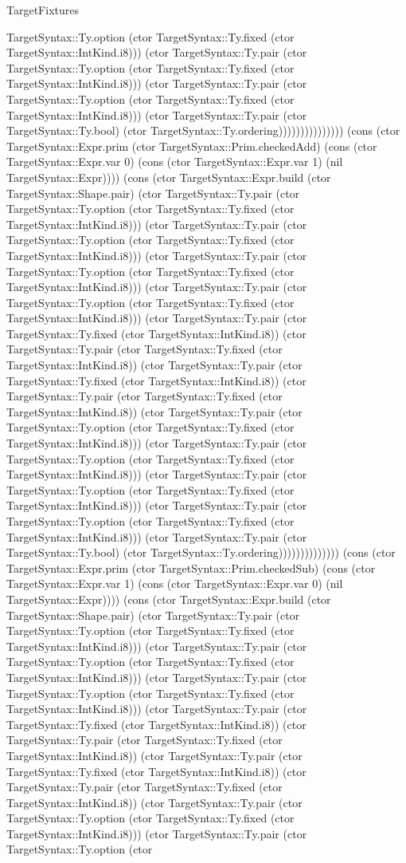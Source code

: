 \begin{lexlean}{TargetFixtures}
\begin{semanticmodule}
{TargetSyntax::Ty.option (ctor TargetSyntax::Ty.fixed (ctor TargetSyntax::IntKind.i8))) (ctor TargetSyntax::Ty.pair (ctor TargetSyntax::Ty.option (ctor TargetSyntax::Ty.fixed (ctor TargetSyntax::IntKind.i8))) (ctor TargetSyntax::Ty.pair (ctor TargetSyntax::Ty.option (ctor TargetSyntax::Ty.fixed (ctor TargetSyntax::IntKind.i8))) (ctor TargetSyntax::Ty.pair (ctor TargetSyntax::Ty.bool) (ctor TargetSyntax::Ty.ordering))))))))))))))) (cons (ctor TargetSyntax::Expr.prim (ctor TargetSyntax::Prim.checkedAdd) (cons (ctor TargetSyntax::Expr.var 0) (cons (ctor TargetSyntax::Expr.var 1) (nil TargetSyntax::Expr)))) (cons (ctor TargetSyntax::Expr.build (ctor TargetSyntax::Shape.pair) (ctor TargetSyntax::Ty.pair (ctor TargetSyntax::Ty.option (ctor TargetSyntax::Ty.fixed (ctor TargetSyntax::IntKind.i8))) (ctor TargetSyntax::Ty.pair (ctor TargetSyntax::Ty.option (ctor TargetSyntax::Ty.fixed (ctor TargetSyntax::IntKind.i8))) (ctor TargetSyntax::Ty.pair (ctor TargetSyntax::Ty.option (ctor TargetSyntax::Ty.fixed (ctor TargetSyntax::IntKind.i8))) (ctor TargetSyntax::Ty.pair (ctor TargetSyntax::Ty.option (ctor TargetSyntax::Ty.fixed (ctor TargetSyntax::IntKind.i8))) (ctor TargetSyntax::Ty.pair (ctor TargetSyntax::Ty.fixed (ctor TargetSyntax::IntKind.i8)) (ctor TargetSyntax::Ty.pair (ctor TargetSyntax::Ty.fixed (ctor TargetSyntax::IntKind.i8)) (ctor TargetSyntax::Ty.pair (ctor TargetSyntax::Ty.fixed (ctor TargetSyntax::IntKind.i8)) (ctor TargetSyntax::Ty.pair (ctor TargetSyntax::Ty.fixed (ctor TargetSyntax::IntKind.i8)) (ctor TargetSyntax::Ty.pair (ctor TargetSyntax::Ty.option (ctor TargetSyntax::Ty.fixed (ctor TargetSyntax::IntKind.i8))) (ctor TargetSyntax::Ty.pair (ctor TargetSyntax::Ty.option (ctor TargetSyntax::Ty.fixed (ctor TargetSyntax::IntKind.i8))) (ctor TargetSyntax::Ty.pair (ctor TargetSyntax::Ty.option (ctor TargetSyntax::Ty.fixed (ctor TargetSyntax::IntKind.i8))) (ctor TargetSyntax::Ty.pair (ctor TargetSyntax::Ty.option (ctor TargetSyntax::Ty.fixed (ctor TargetSyntax::IntKind.i8))) (ctor TargetSyntax::Ty.pair (ctor TargetSyntax::Ty.bool) (ctor TargetSyntax::Ty.ordering)))))))))))))) (cons (ctor TargetSyntax::Expr.prim (ctor TargetSyntax::Prim.checkedSub) (cons (ctor TargetSyntax::Expr.var 1) (cons (ctor TargetSyntax::Expr.var 0) (nil TargetSyntax::Expr)))) (cons (ctor TargetSyntax::Expr.build (ctor TargetSyntax::Shape.pair) (ctor TargetSyntax::Ty.pair (ctor TargetSyntax::Ty.option (ctor TargetSyntax::Ty.fixed (ctor TargetSyntax::IntKind.i8))) (ctor TargetSyntax::Ty.pair (ctor TargetSyntax::Ty.option (ctor TargetSyntax::Ty.fixed (ctor TargetSyntax::IntKind.i8))) (ctor TargetSyntax::Ty.pair (ctor TargetSyntax::Ty.option (ctor TargetSyntax::Ty.fixed (ctor TargetSyntax::IntKind.i8))) (ctor TargetSyntax::Ty.pair (ctor TargetSyntax::Ty.fixed (ctor TargetSyntax::IntKind.i8)) (ctor TargetSyntax::Ty.pair (ctor TargetSyntax::Ty.fixed (ctor TargetSyntax::IntKind.i8)) (ctor TargetSyntax::Ty.pair (ctor TargetSyntax::Ty.fixed (ctor TargetSyntax::IntKind.i8)) (ctor TargetSyntax::Ty.pair (ctor TargetSyntax::Ty.fixed (ctor TargetSyntax::IntKind.i8)) (ctor TargetSyntax::Ty.pair (ctor TargetSyntax::Ty.option (ctor TargetSyntax::Ty.fixed (ctor TargetSyntax::IntKind.i8))) (ctor TargetSyntax::Ty.pair (ctor TargetSyntax::Ty.option (ctor }
\end{semanticmodule}
\end{lexlean}

